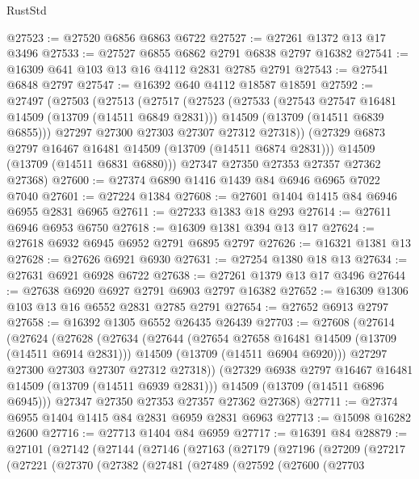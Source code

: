 \begin{lexlean}{RustStd}
\begin{coremodule}
@27523 := @27520 @6856 @6863 @6722
@27527 := @27261 @1372 @13 @17 @3496
@27533 := @27527 @6855 @6862 @2791 @6838 @2797 @16382
@27541 := @16309 @641 @103 @13 @16 @4112 @2831 @2785 @2791
@27543 := @27541 @6848 @2797
@27547 := @16392 @640 @4112 @18587 @18591
@27592 := @27497
    (@27503
      (@27513
        (@27517
          (@27523
            (@27533
              (@27543 @27547 @16481 @14509 (@13709 (@14511 @6849 @2831)))
              @14509
              (@13709 (@14511 @6839 @6855)))
            @27297
            @27300
            @27303
            @27307
            @27312
            @27318))
        (@27329 @6873 @2797 @16467 @16481 @14509 (@13709 (@14511 @6874 @2831)))
        @14509
        (@13709 (@14511 @6831 @6880)))
      @27347
      @27350
      @27353
      @27357
      @27362
      @27368)
@27600 := @27374 @6890 @1416 @1439 @84 @6946 @6965 @7022 @7040
@27601 := @27224 @1384
@27608 := @27601 @1404 @1415 @84 @6946 @6955 @2831 @6965
@27611 := @27233 @1383 @18 @293
@27614 := @27611 @6946 @6953 @6750
@27618 := @16309 @1381 @394 @13 @17
@27624 := @27618 @6932 @6945 @6952 @2791 @6895 @2797
@27626 := @16321 @1381 @13
@27628 := @27626 @6921 @6930
@27631 := @27254 @1380 @18 @13
@27634 := @27631 @6921 @6928 @6722
@27638 := @27261 @1379 @13 @17 @3496
@27644 := @27638 @6920 @6927 @2791 @6903 @2797 @16382
@27652 := @16309 @1306 @103 @13 @16 @6552 @2831 @2785 @2791
@27654 := @27652 @6913 @2797
@27658 := @16392 @1305 @6552 @26435 @26439
@27703 := @27608
    (@27614
      (@27624
        (@27628
          (@27634
            (@27644
              (@27654 @27658 @16481 @14509 (@13709 (@14511 @6914 @2831)))
              @14509
              (@13709 (@14511 @6904 @6920)))
            @27297
            @27300
            @27303
            @27307
            @27312
            @27318))
        (@27329 @6938 @2797 @16467 @16481 @14509 (@13709 (@14511 @6939 @2831)))
        @14509
        (@13709 (@14511 @6896 @6945)))
      @27347
      @27350
      @27353
      @27357
      @27362
      @27368)
@27711 := @27374 @6955 @1404 @1415 @84 @2831 @6959 @2831 @6963
@27713 := @15098 @16282 @2600
@27716 := @27713 @1404 @84 @6959
@27717 := @16391 @84
@28879 := @27101
    (@27142
      (@27144
        (@27146
          (@27163
            (@27179
              (@27196
                (@27209
                  (@27217
                    (@27221
                      (@27370
                        (@27382
                          (@27481
                            (@27489
                              (@27592
                                (@27600
                                  (@27703

\end{coremodule}
\end{lexlean}
